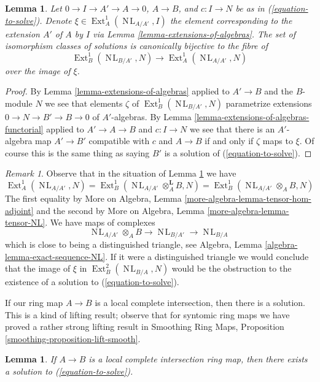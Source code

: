 \documentclass{stacks-project}
\theoremstyle{plain}
\newtheorem{lemma}[subsection]{Lemma}
\theoremstyle{definition}
\theoremstyle{remark}
\newtheorem{remark}[subsection]{Remark}
\numberwithin{equation}{subsection}
\def\Ext{\mathop{\mathrm{Ext}}\nolimits}
\def\NL{\mathop{N\!L}\nolimits}
\begin{document}
\begin{lemma}
\label{lemma-parametrize-solutions}
Let $0 \to I \to A' \to A \to 0$, $A \to B$, and $c : I \to N$ be as in
(\ref{equation-to-solve}). Denote $\xi \in \Ext^1_A(\NL_{A/A'}, I)$
the element corresponding to the extension $A'$ of $A$ by $I$ via
Lemma \ref{lemma-extensions-of-algebras}. The set of isomorphism
classes of solutions is canonically bijective to the fibre of
$$
\Ext^1_B(\NL_{B/A'}, N) \to \Ext^1_A(\NL_{A/A'}, N)
$$
over the image of $\xi$.
\end{lemma}

\begin{proof}
By Lemma \ref{lemma-extensions-of-algebras} applied to $A' \to B$ and
the $B$-module $N$ we see that elements $\zeta$ of $\Ext^1_B(\NL_{B/A'}, N)$
parametrize extensions $0 \to N \to B' \to B \to 0$ of $A'$-algebras.
By Lemma \ref{lemma-extensions-of-algebras-functorial} applied
to $A' \to A \to B$ and $c : I \to N$ we see that there is an $A'$-algebra
map $A' \to B'$ compatible with $c$ and $A \to B$ if and only if
$\zeta$ maps to $\xi$. Of course this is the same thing as saying $B'$ is a
solution of (\ref{equation-to-solve}).
\end{proof}

\begin{remark}
\label{remark-parametrize-solutions}
Observe that in the situation of Lemma \ref{lemma-parametrize-solutions}
we have
$$
\Ext^1_A(\NL_{A/A'}, N) =
\Ext^1_B(\NL_{A/A'} \otimes_A^\mathbf{L} B, N) =
\Ext^1_B(\NL_{A/A'} \otimes_A B, N)
$$
The first equality by
More on Algebra, Lemma \ref{more-algebra-lemma-tensor-hom-adjoint} and
the second by
More on Algebra, Lemma \ref{more-algebra-lemma-tensor-NL}.
We have maps of complexes
$$
\NL_{A/A'} \otimes_A B \to \NL_{B/A'} \to \NL_{B/A}
$$
which is close to being a distinguished triangle, see
Algebra, Lemma \ref{algebra-lemma-exact-sequence-NL}.
If it were a distinguished triangle we would conclude
that the image of $\xi$ in $\Ext^2_B(\NL_{B/A}, N)$
would be the obstruction to the existence of a solution to
(\ref{equation-to-solve}).
\end{remark}

\noindent
If our ring map $A \to B$ is a local complete intersection, then there
is a solution. This is a kind of lifting result; observe that
for syntomic ring maps we have proved a rather strong lifting result in
Smoothing Ring Maps, Proposition \ref{smoothing-proposition-lift-smooth}.

\begin{lemma}
\label{lemma-existence-lci}
If $A \to B$ is a local complete intersection ring map, then
there exists a solution to (\ref{equation-to-solve}).
\end{lemma}
\end{document}
